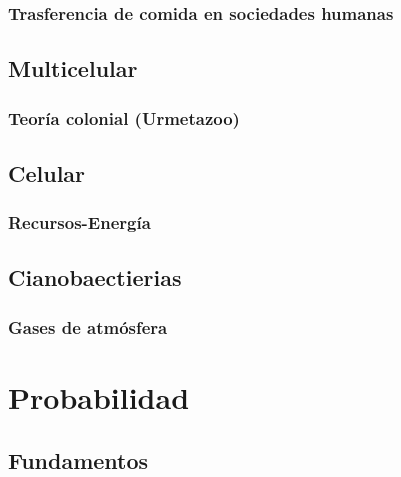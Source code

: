 \documentclass[a4paper,10pt]{article}
\begin{document}
\subsubsection{Trasferencia de comida en sociedades humanas}

\subsection{Multicelular}

\subsubsection{Teoría colonial (Urmetazoo)}

\subsection{Celular}

\subsubsection{Recursos-Energía}

\subsection{Cianobaectierias}

\subsubsection{Gases de atmósfera}






























\section{Probabilidad}

\subsection{Fundamentos}
\end{document}

